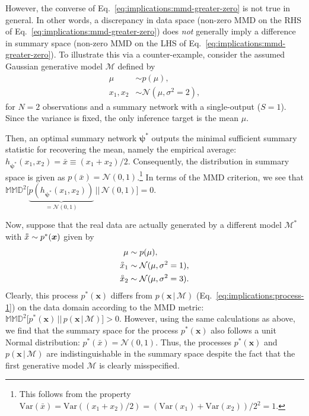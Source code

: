 \documentclass[twoside,11pt]{article}
\newcommand{\observed}[1]{\protect\accentset{\text{o}}{#1}}%
\newcommand{\x}{\boldsymbol{x}}
\newcommand{\psib}{\boldsymbol{\psi}}
\newcommand{\0}{\boldsymbol{0}}
\newcommand{\given}{\,|\,}
\newcommand{\M}{\mathcal{M}}
\begin{document}
However, the converse of Eq.~\ref{eq:implications:mmd-greater-zero} is not true in general.
In other words, a discrepancy in data space (non-zero MMD on the RHS of Eq.~\ref{eq:implications:mmd-greater-zero}) does \emph{not} generally imply a difference in summary space (non-zero MMD on the LHS of Eq.~\ref{eq:implications:mmd-greater-zero}).
To illustrate this via a counter-example, consider the assumed Gaussian generative model $\M$ defined by
\begin{equation}\label{eq:implications:process-1}
    \begin{aligned}
        \mu &\sim p(\mu), \\
        x_1,x_2  &\sim \mathcal{N}(\mu, \sigma^2 = 2),
    \end{aligned}
\end{equation}
for $N = 2$ observations and a summary network with a single-output ($S = 1$).
Since the variance is fixed, the only inference target is the mean $\mu$.

Then, an optimal summary network $\psib^*$ outputs the minimal sufficient summary statistic for recovering the mean, namely the empirical average: $h_{\psib^*}(x_1, x_2) = \bar{x} \equiv (x_1 + x_2) / 2$. 
Consequently, the distribution in summary space is given as $p(\bar{x}) = \mathcal{N}(0, 1)$.\footnote{This follows from the property $\text{Var}(\bar{x}) = \text{Var}((x_1 + x_2)/ 2) = (\text{Var}(x_1) + \text{Var}(x_2)) / 2^2 = 1$.}
In terms of the MMD criterion, we see that $\mathbb{MMD}^2\big[\underbrace{p(h_{\psib^*}(x_1, x_2))}_{=\mathcal{N}(0, 1)}\,||\,\mathcal{N}(0, 1)\big] = 0$.

Now, suppose that the real data are actually generated by a different model $\M^*$ with $\observed{x}\sim p^*(\x)$ given by 
\begin{equation}\label{eq:implications:process-2}
    \begin{aligned}
        \mu &\sim p(\mu),\\
        \observed{x}_1 &\sim \mathcal{N}(\mu, \sigma^2 = 1), \\
        \observed{x}_2 &\sim \mathcal{N}(\mu, \sigma^2 = 3).
    \end{aligned}
\end{equation}
Clearly, this process $p^*(\x)$ differs from $p(\x\given\M)$ (Eq.~\ref{eq:implications:process-1}) on the data domain according to the MMD metric: %
$\mathbb{MMD}^2\big[p^*(\x)\,||\,p(\x \given \mathcal{M})\big] > 0$. 
However, using the same calculations as above, we find that the summary space for the process $p^*(\x)$ also follows a unit Normal distribution: $p^*(\bar{x}) = \mathcal{N}(0, 1)$.
Thus, the processes $p^*(\x)$ and $p(\x\given\M)$ are indistinguishable in the summary space despite the fact that the first generative model $\M$ is clearly misspecified.
\end{document}
